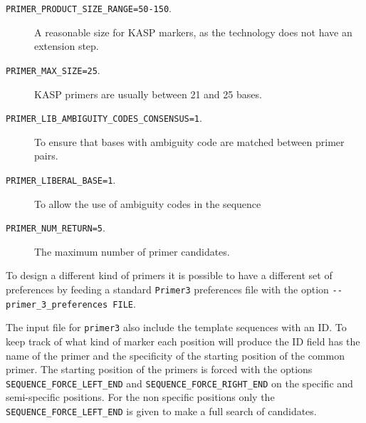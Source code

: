 \begin{description}
\item[\texttt{PRIMER\_PRODUCT\_SIZE\_RANGE=50-150}.] A reasonable size for KASP markers, as the technology does not have an extension step. 
\item[\texttt{PRIMER\_MAX\_SIZE=25}.] KASP primers are usually between 21 and 25 bases.
\item[\texttt{PRIMER\_LIB\_AMBIGUITY\_CODES\_CONSENSUS=1}.] To ensure that bases with ambiguity code are matched between primer pairs. 
\item[\texttt{PRIMER\_LIBERAL\_BASE=1}.] To allow the use of ambiguity codes in the sequence
\item[\texttt{PRIMER\_NUM\_RETURN=5}.] The maximum number of primer candidates. 
\end{description}
To design a different kind of primers it is possible to have a different set of preferences by feeding a standard \texttt{Primer3} preferences file with the option \verb|--primer_3_preferences FILE|. 

The input file for \verb|primer3| also include the template sequences with an ID. 
To keep track of what kind of marker each position will produce the ID field has the name of the primer and the specificity of the starting position of the common primer. 
The starting position of the primers is forced with the options \verb|SEQUENCE_FORCE_LEFT_END| and \verb|SEQUENCE_FORCE_RIGHT_END| on the specific and semi-specific positions. 
For the non specific positions only the \verb|SEQUENCE_FORCE_LEFT_END| is given to make a full search of candidates. 

